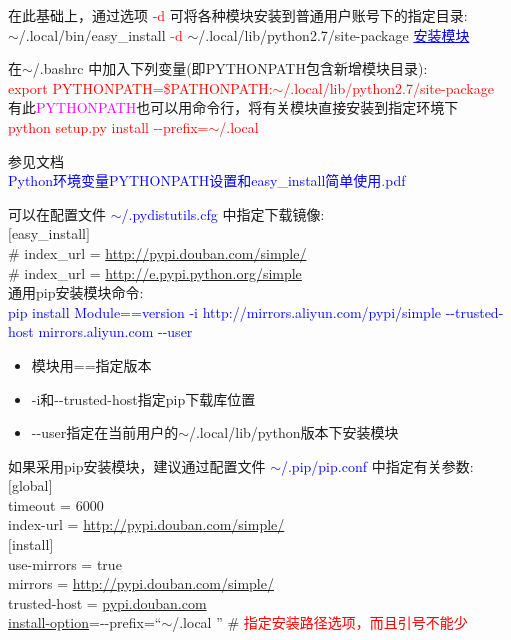 \documentclass[10pt,a4paper]{article}
\begin{document}
在此基础上，通过选项 \textcolor{red}{-d} 可将各种模块安装到普通用户账号下的指定目录:\\
$\sim$/.local/bin/easy\_install \textcolor{red}{-d} $\sim$/.local/lib/python2.7/site-package \textcolor{blue}{\underline{安装模块}}

在$\sim$/.bashrc 中加入下列变量(即\textrm{PYTHONPATH}包含新增模块目录):\\
\textcolor{red}{export PYTHONPATH=\$PATHONPATH:$\sim$/.local/lib/python2.7/site-package}\\

有此\textcolor{magenta}{PYTHONPATH}也可以用命令行，将有关模块直接安装到指定环境下\\
\textcolor{red}{python setup.py install -\/-prefix=$\sim$/.local}

参见文档\\
\textcolor{blue}{\textrm{Python}环境变量\textrm{PYTHONPATH}设置和\textrm{easy\_install}简单使用.pdf}

可以在配置文件 \textcolor{blue}{$\sim$/.pydistutils.cfg} 中指定下载镜像:\\
$[$easy\_install$]$\\
\# index\_url = \url{http://pypi.douban.com/simple/} \\
\# index\_url = \url{http://e.pypi.python.org/simple} \\

通用\textrm{pip}安装模块命令:\\
\textcolor{blue}{\textrm{pip install Module==version -i http://mirrors.aliyun.com/pypi/simple -\/-trusted-host mirrors.aliyun.com -\/-user}}\\
\begin{itemize}
	\item 模块用\textrm{==}指定版本
	\item \textrm{-i}和\textrm{-\/-trusted-host}指定\textrm{pip}下载库位置
	\item \textrm{-\/-}user指定在当前用户的{$\sim$/.local/lib/python}版本下安装模块
\end{itemize}

如果采用\textrm{pip}安装模块，建议通过配置文件 \textcolor{blue}{$\sim$/.pip/pip.conf} 中指定有关参数:\\
$[$global$]$\\
timeout = 6000\\
index-url = \url{http://pypi.douban.com/simple/} \\
$[$install$]$\\
use-mirrors = true\\
mirrors = \url{http://pypi.douban.com/simple/} \\
trusted-host = \url{pypi.douban.com} \\
\underline{install-option}=-\/-prefix=``$\sim$/.local '' \# \textcolor{red}{指定安装路径选项，而且引号不能少} \\
\end{document}
